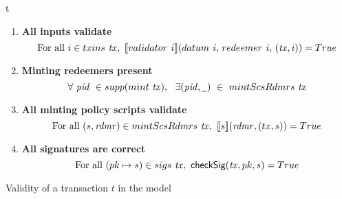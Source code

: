 \begin{ruledfigure}{t}
\begin{enumerate}
  \item
    \label{rule:all-inputs-validate}
    \textbf{All inputs validate}
    \begin{displaymath}
      \textrm{For all } i \in \inputs~\var{tx},\ \applyScript{\validator~\var{i}}(\datum~\var{i},\, \redeemer~\var{i},\, (\var{tx}, i)) = \true
    \end{displaymath}
%
  \item
    \label{rule:forging}
    \textbf{Minting redeemers present}
    \begin{displaymath}
      \forall ~\var{pid}~ \in \supp(\mint~\var{tx}), ~~\exists
      (\var{pid},\wcard) ~\in~ \mintScsRdmrs~\var{tx}
    \end{displaymath}
  \medskip %
  \item
    \label{rule:all-mpss-run}
    \textbf{All minting policy scripts validate}
    \begin{displaymath}
      \textrm{For all } (s, \var{rdmr}) \in \mintScsRdmrs~\var{tx},\ \applyMPScript{s}(\var{rdmr}, (tx, s)) = \true
    \end{displaymath}
  \medskip %

  \item
    \label{rule:sigs-ok}
    \textbf{All signatures are correct}
    \begin{displaymath}
      \textrm{For all } (pk \mapsto s) \in \sigs~\var{tx},\ \checkSig(\var{tx}, pk, s) = \true
    \end{displaymath}

\end{enumerate}
\caption{Validity of a transaction $t$ in the \EUTXOma model}
\label{fig:validity}
\end{ruledfigure}
%

